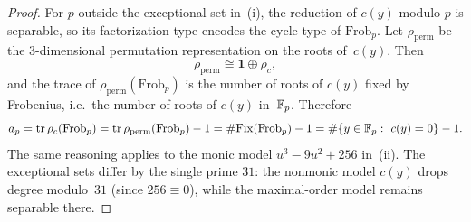 \begin{proof}
For \(p\) outside the exceptional set in~(i), the reduction of \(c(y)\) modulo \(p\) is separable, so its factorization type encodes the cycle type of \(\mathrm{Frob}_p\). Let \(\rho_{\mathrm{perm}}\) be the \(3\)-dimensional permutation representation on the roots of~\(c(y)\). Then
\[
\rho_{\mathrm{perm}}\cong \mathbf{1}\oplus \rho_c,
\]
and the trace of \(\rho_{\mathrm{perm}}(\mathrm{Frob}_p)\) is the number of roots of \(c(y)\) fixed by Frobenius, i.e.\ the number of roots of \(c(y)\) in~\(\mathbb{F}_p\). Therefore
\[
a_p=\operatorname{tr}\rho_c(\mathrm{Frob}_p)=\operatorname{tr}\rho_{\mathrm{perm}}(\mathrm{Frob}_p)-1
=\#\mathrm{Fix}(\mathrm{Frob}_p)-1
=\#\{y\in \mathbb{F}_p:\ c(y)=0\}-1.
\]
The same reasoning applies to the monic model \(u^3-9u^2+256\) in~(ii). The exceptional sets differ by the single prime \(31\): the nonmonic model \(c(y)\) drops degree modulo~\(31\) (since \(256\equiv 0\)), while the maximal-order model remains separable there.
\end{proof}
